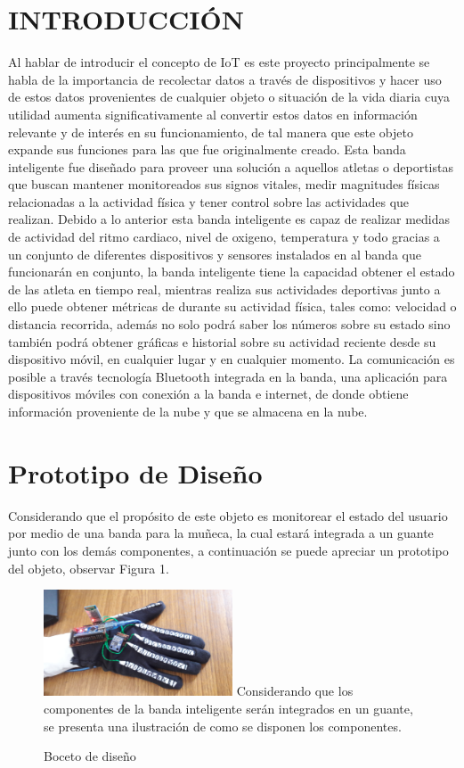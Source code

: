 \documentclass[osajnl,twocolumn,showpacs,superscriptaddress,10pt]{revtex4-1}
\begin{document}
\section{INTRODUCCIÓN}
Al hablar de introducir el concepto de IoT es este proyecto principalmente se habla de la importancia de recolectar datos a través de dispositivos y hacer uso de estos datos provenientes de cualquier objeto o situación de la vida diaria cuya utilidad aumenta significativamente al convertir estos datos en información relevante y de interés en su funcionamiento, de tal manera que este objeto expande sus funciones para las que fue originalmente creado. Esta banda inteligente fue diseñado para proveer una solución a aquellos atletas o deportistas que buscan mantener monitoreados sus signos vitales, medir magnitudes físicas relacionadas a la actividad física y tener control sobre las actividades que realizan. Debido a lo anterior esta banda inteligente es capaz de realizar medidas de actividad del ritmo cardiaco, nivel de oxigeno, temperatura y todo gracias a un conjunto de diferentes dispositivos y sensores instalados en al banda que funcionarán en conjunto, la banda inteligente tiene la capacidad obtener el estado de las atleta en tiempo real, mientras realiza sus actividades deportivas junto a ello puede obtener métricas de durante su actividad física, tales como: velocidad o distancia recorrida, además no solo podrá saber los números sobre su estado sino también podrá obtener gráficas e historial sobre su actividad reciente desde su dispositivo móvil, en cualquier lugar y en cualquier momento. La comunicación es posible a través tecnología Bluetooth integrada en la banda, una aplicación para dispositivos móviles con conexión a la banda e internet, de donde obtiene información proveniente de la nube y que se almacena en la nube.

\section{Prototipo de Diseño}
Considerando que el propósito de este objeto es monitorear el estado del usuario por medio de una banda para la muñeca, la cual estará integrada a un guante junto con los demás componentes, a continuación se puede apreciar un prototipo del objeto, observar Figura 1.


\begin{figure} [H] \centering 
\caption{Boceto de diseño}

\includegraphics[width=0.5\textwidth]{prototipo.jpg} 
Considerando que los componentes de la banda inteligente serán integrados en un guante, se presenta una ilustración de como se disponen los componentes. 
\end{figure}
\end{document}
